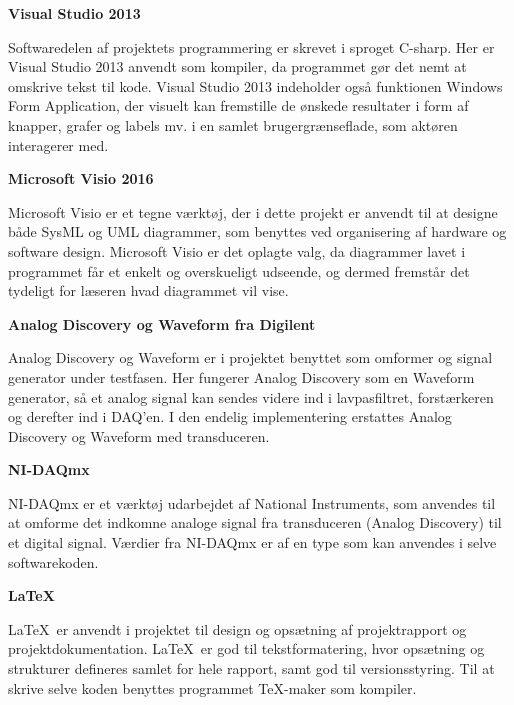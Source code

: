\textbf{Visual Studio 2013}

Softwaredelen af projektets programmering er skrevet i sproget C-sharp. Her er Visual Studio 2013 anvendt som kompiler, da programmet gør det nemt at omskrive tekst til kode. Visual Studio 2013 indeholder også funktionen Windows Form Application, der visuelt kan fremstille de ønskede resultater i form af knapper, grafer og labels mv. i en samlet brugergrænseflade, som aktøren interagerer med. 

\textbf{Microsoft Visio 2016}

Microsoft Visio er et tegne værktøj, der i dette projekt er anvendt til at designe både SysML og UML diagrammer, som benyttes ved organisering af hardware og software design. Microsoft Visio er det oplagte valg, da diagrammer lavet i programmet får et enkelt og overskueligt udseende, og dermed fremstår det tydeligt for læseren hvad diagrammet vil vise.

\textbf{Analog Discovery og Waveform fra Digilent}

Analog Discovery og Waveform er i projektet benyttet som omformer og signal generator under testfasen. Her fungerer Analog Discovery som en Waveform generator, så et analog signal kan sendes videre ind i lavpasfiltret, forstærkeren og derefter ind i DAQ’en. I den endelig implementering erstattes Analog Discovery og Waveform med transduceren. 

\textbf{NI-DAQmx}

NI-DAQmx er et værktøj udarbejdet af National Instruments, som anvendes til at omforme det indkomne analoge signal fra transduceren (Analog Discovery) til et digital signal. Værdier fra NI-DAQmx er af en type som kan anvendes i selve softwarekoden. 

\textbf{\LaTeX}

\LaTeX\ er anvendt i projektet til design og opsætning af projektrapport og projektdokumentation. \LaTeX\ er god til tekstformatering, hvor opsætning og strukturer defineres samlet for hele rapport, samt god til versionsstyring. Til at skrive selve koden benyttes programmet TeX-maker som kompiler. 

